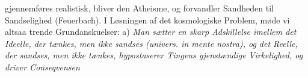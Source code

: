 \documentclass[12pt]{book}
\newcommand{\opage}[1]{\marginnote{\footnotesize\textit{[#1]}}}
\begin{document}
%
gjennemføres realistisk, bliver den Atheisme, og forvandler Sandheden til Sandselighed
(Feuerbach). I Løsningen af det kosmologiske Problem, møde vi altsaa trende
Grundanskuelser: a) \emph{Man sætter en skarp Adskillelse imellem det Ideelle, der
tænkes, men ikke sandses \textit{(univers. in mente nostra)}, og det Reelle, der sandses,
men ikke tænkes, hypostaserer Tingens gjenstændige Virkelighed, og driver Conseqvensen}
\opage{193} %
%
\end{document}
